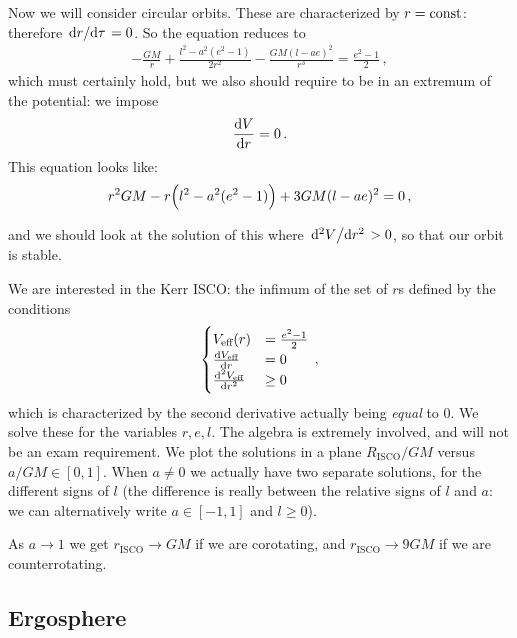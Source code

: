 \documentclass[main.tex]{subfiles}
\begin{document}
Now we will consider circular orbits. These are characterized by \(r = \text{const}\): therefore \(\dv*{r}{\tau }=0\). So the equation reduces to 
%
\begin{align}
    -\frac{GM}{r} + \frac{l^2 - a^2 (e^2-1)}{2r^2} - \frac{GM(l - ae)^2}{r^3} = \frac{e^2-1}{2}
\,,
\end{align}
%
which must certainly hold, but we also should require to be in an extremum of the potential: we impose 
%
\begin{align}
  \dv{V}{r} = 0
\,.
\end{align}
%
This equation looks like: 
%
\begin{align}
  r^2 GM - r \qty(l^2 - a^2(e^2-1)) + 3GM (l-ae)^2=0
\,,
\end{align}
%

and we should look at the solution of this where \(\dv*[2]{V}{r}>0\), so that our orbit is stable. 

We are interested in the Kerr ISCO: the infimum of the set of \(r\)s defined by the conditions 
%
\begin{subequations}
\begin{align}
  \begin{cases}
      V _{\text{eff}} (r) &= \frac{e^2-1}{2}  \\
      \dv{V _{\text{eff}}}{r} (r)&= 0  \\
      \dv[2]{V _{\text{eff}}}{r} (r) &\geq 0
  \end{cases}
\,,
\end{align}
\end{subequations}
%
which is characterized by the second derivative actually being \emph{equal} to 0. We solve these for the variables \(r, e, l\).
The algebra is extremely involved, and will not be an exam requirement. We plot the solutions in a plane \(R _{\text{ISCO}} / GM\) versus \(a/GM \in [0,1]\). When \(a \neq 0\) we actually have two separate solutions, for the different signs of \(l\) (the difference is really between the relative signs of \(l\) and \(a\): we can alternatively write \(a \in [-1, 1]\) and \(l \geq 0\)). 

As \( a \rightarrow 1\) we get \(r _{\text{ISCO}} \rightarrow GM\) if we are corotating, and \(r _{\text{ISCO}} \rightarrow 9GM\) if we are counterrotating. 

\subsection{Ergosphere}
\end{document}

